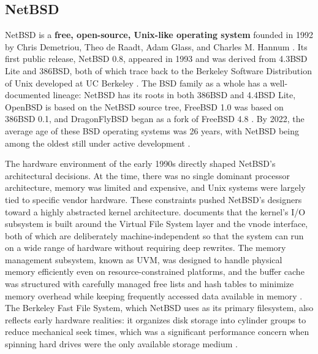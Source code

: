 \subsection{NetBSD} \label{netbsd}

NetBSD is a \textbf{free, open-source, Unix-like operating system} founded in 1992 by Chris Demetriou, Theo de Raadt, Adam Glass,
and Charles M. Hannum \parencite{netBSDnd}. Its first public release, NetBSD 0.8, appeared in 1993 and was derived
from 4.3BSD Lite and 386BSD, both of which trace back to the Berkeley Software Distribution of Unix developed at UC Berkeley
\parencite{netBSDnd}. The BSD family as a whole has a well-documented lineage: NetBSD has its roots in both 386BSD
and 4.4BSD Lite, OpenBSD is based on the NetBSD source tree, FreeBSD 1.0 was based on 386BSD 0.1, and DragonFlyBSD began as
a fork of FreeBSD 4.8 \parencite{thomas_rantugi2022}. By 2022, the average age of these BSD operating systems was 26 years, with
NetBSD being among the oldest still under active development \parencite{thomas_rantugi2022}.

The hardware environment of the early 1990s directly shaped NetBSD's architectural decisions. At the time, there was no single
dominant processor architecture, memory was limited and expensive, and Unix systems were largely tied to specific vendor hardware.
These constraints pushed NetBSD's designers toward a highly abstracted kernel architecture. \textcite{chung2002} documents that the kernel's
I/O subsystem is built around the Virtual File System layer and the vnode interface, both of which are deliberately machine-independent
so that the system can run on a wide range of hardware without requiring deep rewrites. The memory management subsystem, known as UVM,
was designed to handle physical memory efficiently even on resource-constrained platforms, and the buffer cache was structured with
carefully managed free lists and hash tables to minimize memory overhead while keeping frequently accessed data available in memory \parencite{chung2002}.
The Berkeley Fast File System, which NetBSD uses as its primary filesystem, also reflects early hardware realities: it organizes disk storage into
cylinder groups to reduce mechanical seek times, which was a significant performance concern when spinning hard drives were the only available storage
medium \parencite{chung2002}.

